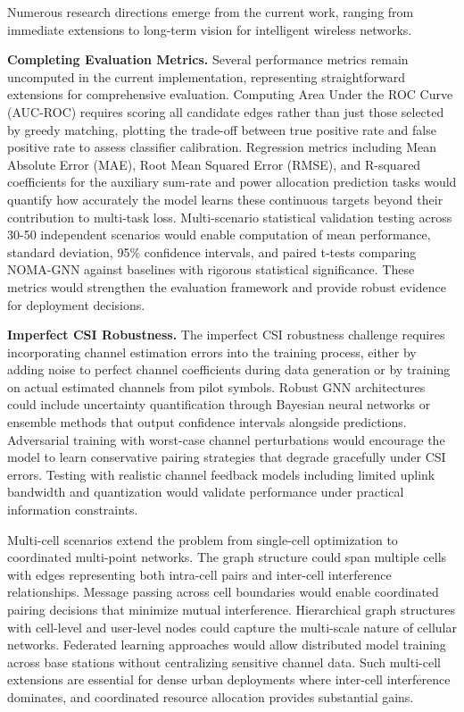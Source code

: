 Numerous research directions emerge from the current work, ranging from immediate extensions to long-term vision for intelligent wireless networks. 

\textbf{Completing Evaluation Metrics.} Several performance metrics remain uncomputed in the current implementation, representing straightforward extensions for comprehensive evaluation. Computing Area Under the ROC Curve (AUC-ROC) requires scoring all candidate edges rather than just those selected by greedy matching, plotting the trade-off between true positive rate and false positive rate to assess classifier calibration. Regression metrics including Mean Absolute Error (MAE), Root Mean Squared Error (RMSE), and R-squared coefficients for the auxiliary sum-rate and power allocation prediction tasks would quantify how accurately the model learns these continuous targets beyond their contribution to multi-task loss. Multi-scenario statistical validation testing across 30-50 independent scenarios would enable computation of mean performance, standard deviation, 95\% confidence intervals, and paired t-tests comparing NOMA-GNN against baselines with rigorous statistical significance. These metrics would strengthen the evaluation framework and provide robust evidence for deployment decisions.

\textbf{Imperfect CSI Robustness.} The imperfect CSI robustness challenge requires incorporating channel estimation errors into the training process, either by adding noise to perfect channel coefficients during data generation or by training on actual estimated channels from pilot symbols. Robust GNN architectures could include uncertainty quantification through Bayesian neural networks or ensemble methods that output confidence intervals alongside predictions. Adversarial training with worst-case channel perturbations would encourage the model to learn conservative pairing strategies that degrade gracefully under CSI errors. Testing with realistic channel feedback models including limited uplink bandwidth and quantization would validate performance under practical information constraints.

Multi-cell scenarios extend the problem from single-cell optimization to coordinated multi-point networks. The graph structure could span multiple cells with edges representing both intra-cell pairs and inter-cell interference relationships. Message passing across cell boundaries would enable coordinated pairing decisions that minimize mutual interference. Hierarchical graph structures with cell-level and user-level nodes could capture the multi-scale nature of cellular networks. Federated learning approaches would allow distributed model training across base stations without centralizing sensitive channel data. Such multi-cell extensions are essential for dense urban deployments where inter-cell interference dominates, and coordinated resource allocation provides substantial gains.

